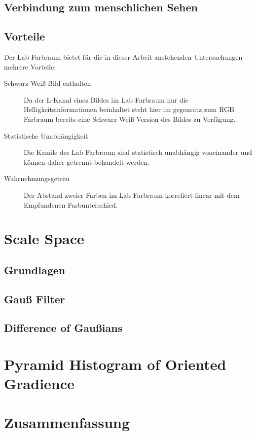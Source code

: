 \subsection{Verbindung zum menschlichen Sehen}

\blindtext

\subsection{Vorteile}

Der Lab Farbraum bietet für die in dieser Arbeit anstehenden Untersuchungen mehrere Vorteile:

\begin{description}
	\item[Schwarz Weiß Bild enthalten]{Da der L-Kanal eines Bildes im Lab Farbraum nur die Helligkeitsinformationen beinhaltet steht hier im gegensatz zum RGB Farbraum bereits eine Schwarz Weiß Version des Bildes zu Verfügung.}
	\item[Statistische Unabhängigkeit]{Die Kanäle des Lab Farbraum sind statistisch unabhängig voneinander und können daher getrennt behandelt werden.}
	\item[Wahrnehmungsgetreu]{Der Abstand zweier Farben im Lab Farbraum korreliert linear mit dem Empfundenen Farbunterschied.}
\end{description}

\section{Scale Space}

\blindtext

\subsection{Grundlagen}

\blindtext

\subsection{Gauß Filter}

\blindtext

\subsection{Difference of Gaußians}

\blindtext

\section{Pyramid Histogram of Oriented Gradience}

\blindtext

\section{Zusammenfassung}

\blindtext
